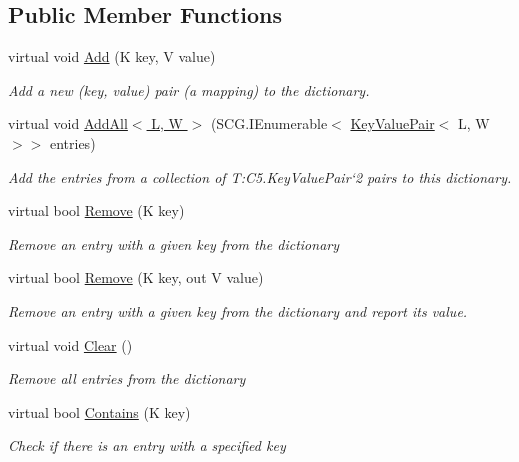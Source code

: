 \subsection*{Public Member Functions}
\begin{DoxyCompactItemize}
\item 
virtual void \hyperlink{class_c5_1_1_dictionary_base_a0d7b0e8b7b2eb71b9478afac991c28b7}{Add} (K key, V value)
\begin{DoxyCompactList}\small\item\em Add a new (key, value) pair (a mapping) to the dictionary. \end{DoxyCompactList}\item 
virtual void \hyperlink{class_c5_1_1_dictionary_base_a454d6f4ea9e025def47f3105262289af}{Add\+All$<$ L, W $>$} (S\+C\+G.\+I\+Enumerable$<$ \hyperlink{struct_c5_1_1_key_value_pair}{Key\+Value\+Pair}$<$ L, W $>$$>$ entries)
\begin{DoxyCompactList}\small\item\em Add the entries from a collection of T\+:\+C5.\+Key\+Value\+Pair`2 pairs to this dictionary. \end{DoxyCompactList}\item 
virtual bool \hyperlink{class_c5_1_1_dictionary_base_aed74f70614e775dfd55a92bf7dcd94c1}{Remove} (K key)
\begin{DoxyCompactList}\small\item\em Remove an entry with a given key from the dictionary \end{DoxyCompactList}\item 
virtual bool \hyperlink{class_c5_1_1_dictionary_base_a5680ada7ac17ce609554a822af164053}{Remove} (K key, out V value)
\begin{DoxyCompactList}\small\item\em Remove an entry with a given key from the dictionary and report its value. \end{DoxyCompactList}\item 
virtual void \hyperlink{class_c5_1_1_dictionary_base_ac3a1aa92d354489522afc03f8f303087}{Clear} ()
\begin{DoxyCompactList}\small\item\em Remove all entries from the dictionary \end{DoxyCompactList}\item 
virtual bool \hyperlink{class_c5_1_1_dictionary_base_a71c99b65d5a9c3c3be9fe8c861639495}{Contains} (K key)
\begin{DoxyCompactList}\small\item\em Check if there is an entry with a specified key \end{DoxyCompactList}\item 
$$
\end{DoxyCompactItemize}

